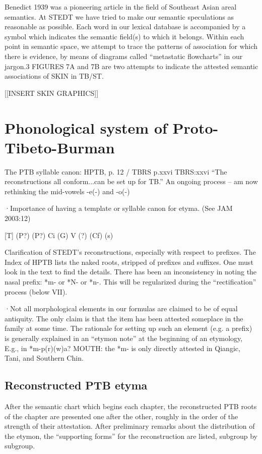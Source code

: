 Benedict 1939 was a pioneering article in the field of Southeast Asian areal semantics. At STEDT we have tried to make our semantic speculations as reasonable as possible. Each word in our lexical database is accompanied by a symbol which indicates the semantic field(s) to which it belongs. Within each point in semantic space, we attempt to trace the patterns of association for which there is evidence, by means of diagrams called “metastatic flowcharts” in our jargon.3 FIGURES 7A and 7B are two attempts to indicate the attested semantic associations of SKIN in TB/ST.

[[INSERT SKIN GRAPHICS]]

\section{Phonological system of Proto-Tibeto-Burman}

	The PTB syllable canon: HPTB, p. 12 / TBRS p.xxvi
	TBRS:xxvi “The reconstructions all conform...can be set up for TB.”
	An ongoing process -- am now rethinking the mid-vowels -e(-) and -o(-)

·Importance of having a template or syllable canon for etyma. (See JAM 2003:12)
		
					[T]
	(P?)	(P?)	Ci	(G)	V	(?)	(Cf)	(s)
	
Clarification of STEDT’s reconstructions, especially with respect to prefixes.
The Index of HPTB lists the naked roots, stripped of prefixes and suffixes. One must look in the text to find the details. There has been an inconsistency in noting the nasal prefix:  *m- or *N- or *n-. This will be regularized during the “rectification” process (below VII).

·Not all morphological elements in our formulas are claimed to be of equal antiquity. The only claim is that the item has been attested someplace in the family at some time.  The rationale for setting up such an element (e.g. a prefix) is generally explained in an “etymon note” at the beginning of an etymology, E.g., in *m-p(r)(w)a? MOUTH: the *m- is only directly attested in Qiangic, Tani, and Southern Chin.


\subsection{Reconstructed PTB etyma}

After the semantic chart which begins each chapter, the reconstructed PTB
roots of the chapter are presented one after the other, roughly in the order of
the strength of their attestation.  After preliminary remarks about the
distribution of the etymon, the “supporting forms” for the reconstruction are
listed, subgroup by subgroup.


